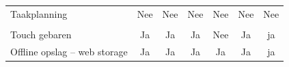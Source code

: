 \begin{table}[]
\begin{tabular}{p{6cm}cccccc}
			   Taakplanning &  \cellcolor{red!50} Nee  &  \cellcolor{red!50} Nee &  \cellcolor{red!50} Nee  & \cellcolor{red!50} Nee &  \cellcolor{red!50} Nee &  \cellcolor{red!50} Nee \\
			   
			    &  & &  &  &  &  \\
			   			   
			   Touch gebaren & \cellcolor{green!40} Ja  & \cellcolor{green!40} Ja & \cellcolor{green!40} Ja  & \cellcolor{red!50} Nee & \cellcolor{green!40} Ja & \cellcolor{green!40} ja \\
			   
			   Offline opslag – web storage & \cellcolor{green!40} Ja  & \cellcolor{green!40} Ja & \cellcolor{green!40} Ja  & \cellcolor{green!40} Ja & \cellcolor{green!40} Ja & \cellcolor{green!40} ja \\

  		\end{tabular}	
 	\end{table}
 	
